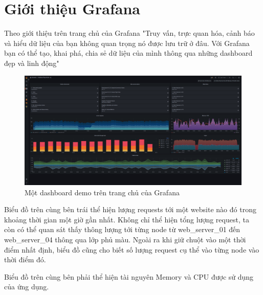 \section{Giới thiệu Grafana}
Theo giới thiệu trên trang chủ của Grafana
"Truy vấn, trực quan hóa, cảnh báo và hiểu dữ liệu của bạn không quan trọng nó được lưu trữ ở đâu. Với Grafana bạn có thể tạo, khai phá, chia sẻ dữ liệu của mình thông qua những dashboard đẹp và linh động"
\begin{figure}[H] %
    \centering %
    \includegraphics[width=1\textwidth]{figures/fig_01.png} 
    \caption{Một dashboard demo trên trang chủ của Grafana} %
    \label{fig:fig_01}
\end{figure}
Biểu đồ trên cùng bên trái thể hiện lượng requests tới một website nào đó trong khoảng thời gian một giờ gần nhất. Không chỉ thể hiện tổng lượng request, ta còn có thể quan sát thấy thông lượng tới từng node từ web\_server\_01 đến web\_server\_04 thông qua lớp phủ màu. Ngoài ra khi giữ chuột vào một thời điểm nhất định, biểu đồ cũng cho biết số lượng request cụ thể vào từng node vào thời điểm đó. 

Biểu đồ trên cùng bên phải thể hiện tài nguyên Memory và CPU được sử dụng của ứng dụng. 


